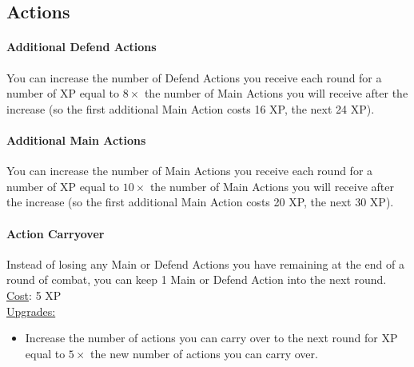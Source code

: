 \subsection{Actions}
\paragraph{Additional Defend Actions}
You can increase the number of Defend Actions you receive each round for a number of XP equal to $8\times$ the number of Main Actions you will receive after the increase (so the first additional Main Action costs 16 XP, the next 24 XP).

\paragraph{Additional Main Actions}
You can increase the number of Main Actions you receive each round for a number of XP equal to $10\times$ the number of Main Actions you will receive after the increase (so the first additional Main Action costs 20 XP, the next 30 XP).

\paragraph{Action Carryover}
Instead of losing any Main or Defend Actions you have remaining at the end of a round of combat, you can keep 1 Main or Defend Action into the next round.
\\
\underline{Cost}: 5 XP
\\
\underline{Upgrades:}
\begin{itemize}
  \item[-] Increase the number of actions you can carry over to the next round for XP equal to $5 \times$ the new number of actions you can carry over.
\end{itemize}
